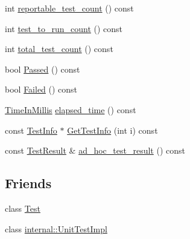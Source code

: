 \begin{DoxyCompactItemize}
int \hyperlink{classtesting_1_1_test_case_a7693150fa71d460a19b291ed6f5c18bd}{reportable\+\_\+test\+\_\+count} () const 
\item 
int \hyperlink{classtesting_1_1_test_case_a47de0cf87858370388275c9d995f1ff4}{test\+\_\+to\+\_\+run\+\_\+count} () const 
\item 
int \hyperlink{classtesting_1_1_test_case_ac7b2ed22822735b7b9ae2740162332c9}{total\+\_\+test\+\_\+count} () const 
\item 
bool \hyperlink{classtesting_1_1_test_case_ad093a04334d7eb8d707a7f1a321b040f}{Passed} () const 
\item 
bool \hyperlink{classtesting_1_1_test_case_a5c0922d310f860e78cca7e215f2fa0e4}{Failed} () const 
\item 
\hyperlink{namespacetesting_a992de1d091ce660f451d1e8b3ce30fd6}{Time\+In\+Millis} \hyperlink{classtesting_1_1_test_case_a80f163d2826ba8586fffb41e8d686727}{elapsed\+\_\+time} () const 
\item 
const \hyperlink{classtesting_1_1_test_info}{Test\+Info} $\ast$ \hyperlink{classtesting_1_1_test_case_a17dfa2a9fde64f5add3615e9426e81e1}{Get\+Test\+Info} (int i) const 
\item 
const \hyperlink{classtesting_1_1_test_result}{Test\+Result} \& \hyperlink{classtesting_1_1_test_case_a3993481a8f0c2253653b5e1ec5934432}{ad\+\_\+hoc\+\_\+test\+\_\+result} () const 
\end{DoxyCompactItemize}
\subsection*{Friends}
\begin{DoxyCompactItemize}
\item 
class \hyperlink{classtesting_1_1_test_case_a5b78b1c2e1fa07ffed92da365593eaa4}{Test}
\item 
class \hyperlink{classtesting_1_1_test_case_acc0a5e7573fd6ae7ad1878613bb86853}{internal\+::\+Unit\+Test\+Impl}
\end{DoxyCompactItemize}


